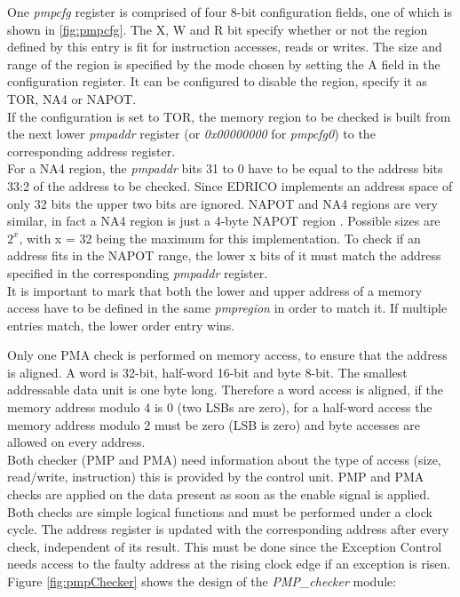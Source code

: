 One \textit{pmpcfg} register is comprised of four 8-bit configuration fields, one of which is shown in \ref{fig:pmpcfg}. The X, W and R bit specify whether or not the region defined by this entry is fit for instruction accesses, reads or writes. The size and range of the region is specified by the mode chosen by setting the A field in the configuration register. It can be configured to disable the region, specify it as \ac{TOR}, \ac{NA4} or \ac{NAPOT}. \\
If the configuration is set to \ac{TOR}, the memory region to be checked is built from the next lower \textit{pmpaddr} register (or \textit{0x00000000} for \textit{pmpcfg0}) to the corresponding address register.\\
For a \ac{NA4} region, the \textit{pmpaddr} bits 31 to 0 have to be equal to the address bits 33:2 of the address to be checked. Since \ac{EDRICO} implements an address space of only 32 bits the upper two bits are ignored. \ac{NAPOT} and \ac{NA4} regions are very similar, in fact a \ac{NA4}
region is just a 4-byte \ac{NAPOT} region \cite{riscv:privileged}. Possible sizes are $2^{x}$, with x = 32 being the maximum for this implementation. To check if an address fits in the \ac{NAPOT} range, the lower x bits of it must match the address specified in the corresponding \textit{pmpaddr} register. \\
It is important to mark that both the lower and upper address of a memory access have to be defined in the same \textit{pmpregion} in order to match it. If multiple entries match, the lower order entry wins.

Only one \ac{PMA} check is performed on memory access, to ensure that the address is aligned. A word is 32-bit, half-word 16-bit and byte 8-bit. The smallest addressable data unit is one byte long. Therefore a word access is aligned, if the memory address modulo 4 is 0 (two \acp{LSB} are zero), for a half-word access the memory address modulo 2 must be zero (\ac{LSB} is zero) and byte accesses are allowed on every address.
\\
Both checker (\ac{PMP} and \ac{PMA}) need information about the type of access (size, read/write, instruction) this is provided by the control unit. \ac{PMP} and \ac{PMA} checks
are applied on the data present as soon as the enable signal is applied. Both checks
are simple logical functions and must be performed under a clock cycle. The address
register is updated with the corresponding address after every check, independent of
its result. This must be done since the Exception Control needs access to the faulty
address at the rising clock edge if an exception is risen.
\\
Figure \ref{fig:pmpChecker} shows the design of the \textit{PMP\_checker} module:

